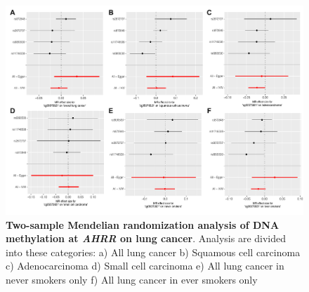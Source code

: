 \documentclass[11pt,oneside]{bristolthesis}
\newcommand{\blandscape}{\begin{landscape}}
\newcommand{\elandscape}{\end{landscape}}
\begin{document}
\blandscape
\begin{figure}[htbp]

{\centering \includegraphics[width=1\linewidth]{figure/07-dnam_lungcancer_mr/sup_fig5-ahrr_2samp} 

}

\caption[Two-sample Mendelian randomization analysis of DNA methylation at \emph{AHRR} on lung cancer]{\textbf{Two-sample Mendelian randomization analysis of DNA methylation at \emph{AHRR} on lung cancer}. Analysis are divided into these categories: a) All lung cancer b) Squamous cell carcinoma c) Adenocarcinoma d) Small cell carcinoma e) All lung cancer in never smokers only f) All lung cancer in ever smokers only}\label{fig:sup-fig5-07}
\end{figure}
\elandscape
\end{document}
